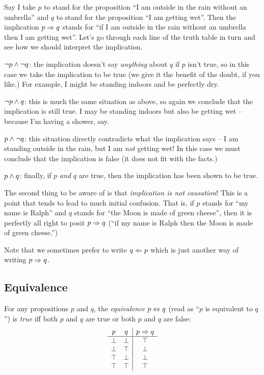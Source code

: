 Say I take $p$ to stand for the proposition ``I am outside in the rain
without an umbrella'' and $q$ to stand for the proposition ``I am
getting wet''.  Then the implication $p \Rightarrow q$ stands for ``if I am
outside in the rain without an umbrella then I am getting wet''.  Let's
go through each line of the truth table in turn and see how we should
interpret the implication.
\begin{description}
\item $\neg{}p \wedge \neg{}q$: the implication doesn't say
\emph{anything} about $q$ if $p$ isn't true, so in this
case we take the implication to be true (we give it the benefit of the
doubt, if you like.)  For example, I might be standing indoors and be
perfectly dry.
\item $\neg{}p \wedge q$: this is much the same situation as above, so
again we conclude that the implication is still true.  I may be standing
indoors but also be getting wet -- because I'm having a shower, say.
\item $p \wedge \neg{}q$: this situation directly contradicts what the
implication says -- I am standing outside in the rain, but I am
\emph{not} getting wet!  In this case we must conclude that the
implication is false (\ie it does not fit with the facts.)
\item $p \wedge q$: finally, if $p$ \emph{and} $q$ are true, then the
implication has been shown to be true.
\end{description}

The second thing to be aware of is that \emph{implication is not
causation}!  This is a point that tends to lead to much initial
confusion.  That is, if $p$ stands for ``my name is Ralph'' and $q$
stands for ``the Moon is made of green cheese'', then it is perfectly
all right to posit $p \Rightarrow q$ (\ie  ``if my name is Ralph then the Moon
is made of green cheese.'')

Note that we sometimes prefer to write $q \Leftarrow p$ which is just another
way of writing $p \Rightarrow q$.

\subsection{Equivalence}

For any propositions $p$ and $q$, the \emph{equivalence} $p \Leftrightarrow q$
(read as ``$p$ is equivalent to $q$'') is \emph{true} iff 
both $p$ and $q$ are true or both $p$ and $q$ are false:
\[
\begin{array}{cc|c}
p       & q       & p \Rightarrow q \\
\hline
\perp  & \perp  & \top \\
\perp  & \top   & \perp \\
\top   & \perp  & \perp \\
\top   & \top   & \top \\
\end{array}
\]

